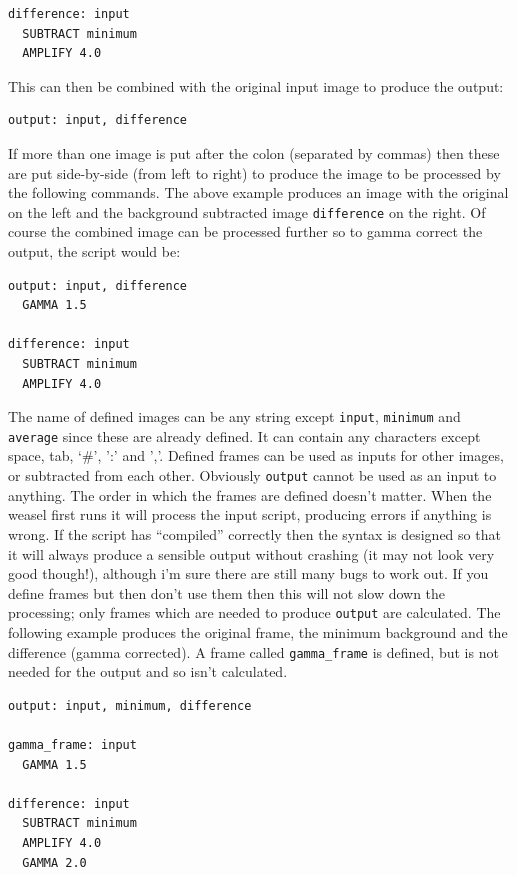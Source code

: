 \documentclass[12pt, a4paper]{article}
\begin{document}
\begin{verbatim}
difference: input
  SUBTRACT minimum
  AMPLIFY 4.0
\end{verbatim}

\noindent This can then be combined with the original input image to produce the output:

\begin{verbatim}
output: input, difference
\end{verbatim}

\noindent If more than one image is put after the colon (separated by commas)
then these are put side-by-side (from left to right) to produce the image to be processed
by the following commands. The above example produces an image with the original on the left
and the background subtracted image \texttt{difference} on the right. Of course the combined
image can be processed further so to gamma correct the output, the script would be:

\begin{verbatim}
output: input, difference
  GAMMA 1.5

difference: input
  SUBTRACT minimum
  AMPLIFY 4.0
\end{verbatim}

The name of defined images can be any string except \texttt{input}, 
\texttt{minimum} and \texttt{average} since these are already defined. It can contain
any characters except space, tab, `\#', ':' and ','.
Defined frames can be used as inputs
for other images, or subtracted from each other. Obviously \texttt{output} cannot be used
as an input to anything. The order in which the frames are defined doesn't matter.
When the weasel first runs it will process the input script, producing errors if anything
is wrong. If the script has ``compiled'' correctly then the syntax is designed so that
it will always produce a sensible output without crashing (it may not look very good though!),
although i'm sure there are still many bugs to work out.
If you define frames but then don't use them then this will not slow down the processing; only
frames which are needed to produce \texttt{output} are calculated. The following example 
produces the original frame, the minimum background and the difference (gamma corrected). A
frame called \texttt{gamma\_frame} is defined, but is not needed for the output and so
isn't calculated.

\begin{verbatim}
output: input, minimum, difference

gamma_frame: input
  GAMMA 1.5

difference: input
  SUBTRACT minimum
  AMPLIFY 4.0
  GAMMA 2.0
\end{verbatim}
\end{document}
